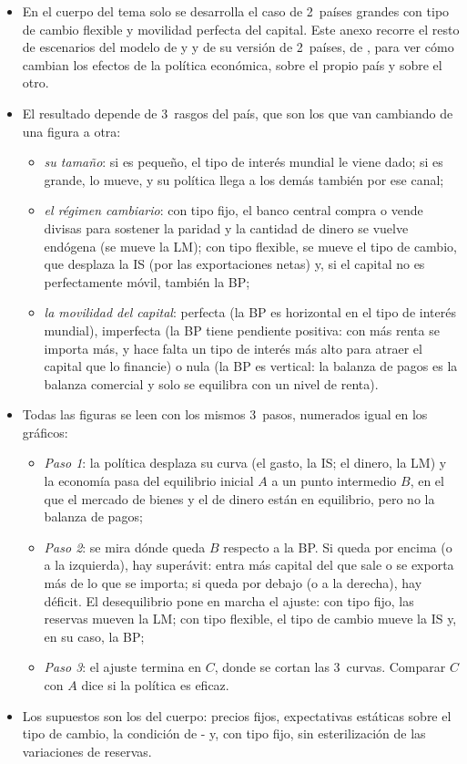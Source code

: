 \documentclass[11pt]{article}
\begin{document}
\begin{itemize}
\item En el cuerpo del tema solo se desarrolla el caso de 2~países grandes con tipo de cambio flexible y movilidad perfecta del capital. Este anexo recorre el resto de escenarios del modelo de \textcite{Fleming1962Domestic} y \textcite{Mundell1963Capital}  y de su versión de 2~países, de \textcite{Mundell1964Reply}, para ver cómo cambian los efectos de la política económica, sobre el propio país y sobre el otro.
\item El resultado depende de 3~rasgos del país, que son los que van cambiando de una figura a otra:
  \begin{itemize}
  \item \emph{su tamaño}: si es pequeño, el tipo de interés mundial le viene dado; si es grande, lo mueve, y su política llega a los demás también por ese canal;
  \item \emph{el régimen cambiario}: con tipo fijo, el banco central compra o vende divisas para sostener la paridad y la cantidad de dinero se vuelve endógena (se mueve la LM); con tipo flexible, se mueve el tipo de cambio, que desplaza la IS (por las exportaciones netas) y, si el capital no es perfectamente móvil, también la BP;
  \item \emph{la movilidad del capital}: perfecta (la BP es horizontal en el tipo de interés mundial), imperfecta (la BP tiene pendiente positiva: con más renta se importa más, y hace falta un tipo de interés más alto para atraer el capital que lo financie) o nula (la BP es vertical: la balanza de pagos es la balanza comercial y solo se equilibra con un nivel de renta).
  \end{itemize}
\item Todas las figuras se leen con los mismos 3~pasos, numerados igual en los gráficos:
  \begin{itemize}
  \item \emph{Paso 1}: la política desplaza su curva (el gasto, la IS; el dinero, la LM) y la economía pasa del equilibrio inicial $A$ a un punto intermedio $B$, en el que el mercado de bienes y el de dinero están en equilibrio, pero no la balanza de pagos;
  \item \emph{Paso 2}: se mira dónde queda $B$ respecto a la BP. Si queda por encima (o a la izquierda), hay superávit: entra más capital del que sale o se exporta más de lo que se importa; si queda por debajo (o a la derecha), hay déficit. El desequilibrio pone en marcha el ajuste: con tipo fijo, las reservas mueven la LM; con tipo flexible, el tipo de cambio mueve la IS y, en su caso, la BP;
  \item \emph{Paso 3}: el ajuste termina en $C$, donde se cortan las 3~curvas. Comparar $C$ con $A$ dice si la política es eficaz.
  \end{itemize}
\item Los supuestos son los del cuerpo: precios fijos, expectativas estáticas sobre el tipo de cambio, la condición de - y, con tipo fijo, sin esterilización de las variaciones de reservas.
\end{itemize}
\end{document}
